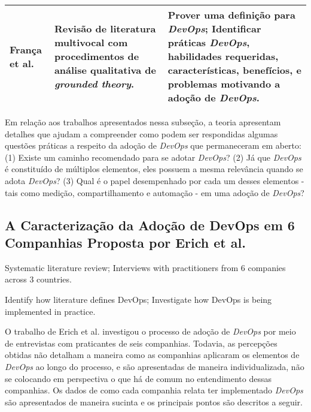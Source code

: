 \begin{table}[hb!]
\begin{tabular}{|p{3cm}|p{6cm}|p{6cm}|}
\hline

\textbf{Fran\c{c}a et al.~\cite{characterizing_devops}}

& Revisão de literatura multivocal com procedimentos de análise qualitativa de
{\it grounded theory}.

& Prover uma definição para {\it DevOps}; \newline \newline
Identificar práticas {\it DevOps}, habilidades requeridas, características,
benefícios, e problemas motivando a adoção de {\it DevOps}. \\

\hline

\end{tabular}
\end{table}

Em relação aos trabalhos apresentados nessa subseção, a teoria apresentam detalhes que ajudam a
compreender como podem ser respondidas algumas questões práticas a
respeito da adoção de {\it DevOps} que permaneceram em aberto: (1) Existe um caminho
recomendado para se adotar \textit{DevOps}? (2) Já que \textit{DevOps} é
constituído de múltiplos elementos, eles possuem a mesma relevância quando se
adota \textit{DevOps}? (3) Qual é o papel desempenhado por cada um desses
elementos - tais como medição, compartilhamento e automação - em uma adoção de
\textit{DevOps}?

\subsection{A Caracterização da Adoção de DevOps em 6 Companhias Proposta por Erich et al. \cite{qualitative_devops_journalsw_17}}\label{secao_adocao_6_companhias}

Systematic literature review;
Interviews with practitioners from 6 companies across 3 countries.

Identify how literature defines DevOps;
Investigate how DevOps is being implemented in practice.

O trabalho de Erich et al. \cite{qualitative_devops_journalsw_17} investigou
o processo de adoção de \textit{DevOps} por meio de entrevistas com praticantes
de seis companhias. Todavia, as percepções obtidas não detalham a maneira como
as companhias aplicaram os elementos de \textit{DevOps} ao longo do processo,
e são apresentadas de maneira individualizada, não se colocando em perspectiva
o que há de comum no entendimento dessas companhias. Os dados de como cada
companhia relata ter implementado \textit{DevOps} são apresentados de maneira
sucinta e os principais pontos são descritos a seguir.

